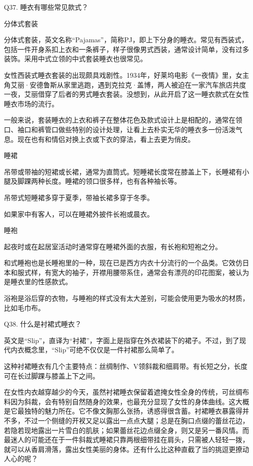 \documentclass[12pt,UTF8]{ctexbook}
\begin{document}
Q37. 睡衣有哪些常见款式？


分体式套装

分体式套装，英文名称“Pajamas”，简称PJ，即上下分身的睡衣。常见有西装式，包括一件开身系扣上衣和一条裤子，样子很像男式西装，通常设计简单，没有过多装饰。采用中式立领的中式套装睡衣也很常见。

女性西装式睡衣套装的出现颇具戏剧性。1934年，好莱坞电影《一夜情》里，女主角艾丽·安德鲁斯从家里逃跑，遇到克拉克·盖博，两人被迫在一家汽车旅店共度一夜，艾丽借穿了后者的男式睡衣套装。没想到，从此开启了这一睡衣款式在女性睡衣市场的流行。

一般来说，套装睡衣的上衣和裤子在整体花色及款式设计上是相配的，通常在领口、袖口和裤管口做些特别的设计处理，让看上去朴实无华的睡衣多一份活泼气息。现在也有和情侣对换上衣或下衣的穿法，看上去更为俏皮。



睡裙



吊带或带袖的短裙或长裙，通常为直筒式。短睡裙长度常在膝盖上下，长睡裙有小腿及脚踝两种长度。睡裙的领口很多样，也有各种袖长等。

吊带式短睡裙多穿于夏季，带袖长裙多穿于冬季。

如果家中有客人，可以在睡裙外披件长袍或晨衣。

睡袍





起夜时或在起居室活动时通常穿在睡裙外面的衣服，有长袍和短袍之分。

和式睡袍也是长睡袍里的一种，现在已是西方内衣十分流行的一个品类。它效仿日本和服式样，有宽大的袖子，开襟用腰带系住，通常会有漂亮的印花图案，被认为是睡衣里的性感款式。

浴袍是浴后穿的衣物，与睡袍的样式没有太大差别，可能会使用更为吸水的材质，比如毛巾布。





Q38. 什么是衬裙式睡衣？


英文是“Slip”，直译为“衬裙”，字面上是指穿在外衣裙装下的裙子。不过，到了现代内衣概念里，“Slip”可绝不仅仅是一件衬裙那么简单了。

这种衬裙睡衣有几个主要特点：丝绸制作、V领斜裁和细肩带。有长短之分，长度可在长过脚踝与膝盖上下之间。





在女性内衣越穿越少的今天，虽然衬裙睡衣保留着遮掩女性全身的传统，可丝绸布料因为斜裁，会有特别自然随身的效果，也最充分显现了女性的身体曲线。这大概是它最独特的魅力所在。它不像文胸那么张扬，诱惑得很含蓄。衬裙睡衣暴露得并不多，不过一个侧缝的开衩又足以露出一点点大腿；总是在胸口点缀的蕾丝花边，若隐若现地露出一片雪白的肌肤；如果蕾丝花边点缀全身，则又是另一番风情。而最迷人的可能还在于一件斜裁式睡裙只靠两根细带挂在肩头，只需被人轻轻一拨，就可以从香肩滑落，露出女性美丽的身体。还有什么比这种直截了当的挑逗更撩动人心的呢？
\end{document}
